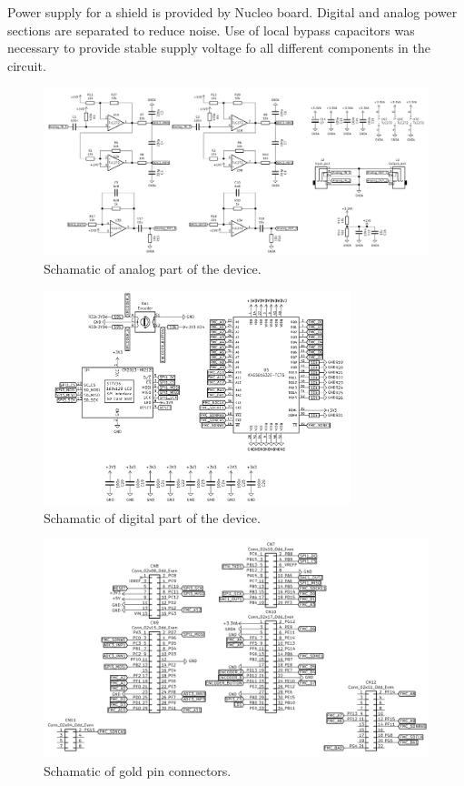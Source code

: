 \documentclass[a4paper,twoside,12pt]{book}
\begin{document}
Power supply for a shield is provided by Nucleo board.
Digital and analog power sections are separated to reduce noise.
Use of local bypass capacitors was necessary to provide stable
supply voltage fo all different components in the circuit.

\begin{figure}[H]
    \centering
    \includegraphics[width=\textwidth]{images/Schematic_analog}
    \caption{Schamatic of analog part of the device.}
    \label{fig:Schematic1}
\end{figure}

\begin{figure}[H]
    \centering
    \includegraphics[width=0.8\textwidth]{images/Schematic_digital}
    \caption{Schamatic of digital part of the device.}
    \label{fig:Schematic2}
\end{figure}

\begin{figure}[H]
    \centering
    \includegraphics[width=\textwidth]{images/Schematic_connectors}
    \caption{Schamatic of gold pin connectors.}
    \label{fig:Schematic3}
\end{figure}
\end{document}
